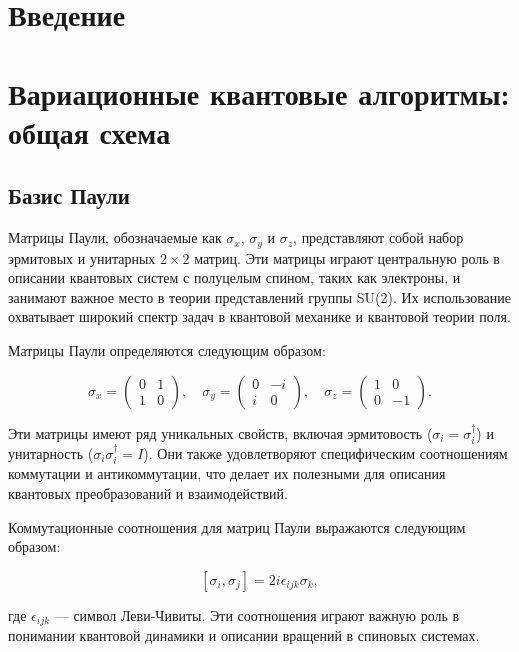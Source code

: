 \documentclass[a4paper]{report}
\begin{document}
\setcounter{page}{2}

\tableofcontents
\newpage

\chapter*{Введение}

\chapter{Вариационные квантовые алгоритмы: общая схема}

\section{Базис Паули}
Матрицы Паули, обозначаемые как $\sigma_x$, $\sigma_y$ и $\sigma_z$, представляют собой набор эрмитовых и унитарных $2 \times 2$ матриц. Эти матрицы играют центральную роль в описании квантовых систем с полуцелым спином, таких как электроны, и занимают важное место в теории представлений группы SU(2). Их использование охватывает широкий спектр задач в квантовой механике и квантовой теории поля.

Матрицы Паули определяются следующим образом:

$$
\sigma_x = \begin{pmatrix}
0 & 1 \\
1 & 0
\end{pmatrix}, \quad
\sigma_y = \begin{pmatrix}
0 & -i \\
i & 0
\end{pmatrix}, \quad
\sigma_z = \begin{pmatrix}
1 & 0 \\
0 & -1
\end{pmatrix}.
$$

Эти матрицы имеют ряд уникальных свойств, включая эрмитовость ($\sigma_i = \sigma_i^\dagger$) и унитарность ($\sigma_i \sigma_i^\dagger = I$). Они также удовлетворяют специфическим соотношениям коммутации и антикоммутации, что делает их полезными для описания квантовых преобразований и взаимодействий.

Коммутационные соотношения для матриц Паули выражаются следующим образом:

$$
[\sigma_i, \sigma_j] = 2i\epsilon_{ijk}\sigma_k,
$$

где $\epsilon_{ijk}$ — символ Леви-Чивиты. Эти соотношения играют важную роль в понимании квантовой динамики и описании вращений в спиновых системах.
\end{document}
